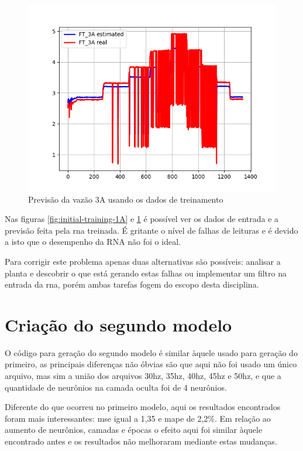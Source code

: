 \documentclass[12pt]{article}
\begin{document}
\begin{figure}
    \centering
    \includegraphics{results/initial-training-3A.png}
    \caption{Previsão da vazão 3A usando os dados de treinamento}
    \label{fig:initial-training-3A}
\end{figure}

Nas figuras \ref{fig:initial-training-1A} e \ref{fig:initial-training-3A} é possível ver os dados de entrada e a previsão feita pela \acrshort{rna} treinada. É gritante o nível de falhas de leituras e é devido a isto que o desempenho da RNA não foi o ideal.

Para corrigir este problema apenas duas alternativas são possíveis: analisar a planta e descobrir o que está gerando estas falhas ou implementar um filtro na entrada da \acrshort{rna}, porém ambas tarefas fogem do escopo desta disciplina.

\section{Criação do segundo modelo}
\label{sec:modelo2}



O código para geração do segundo modelo é similar àquele usado para geração do primeiro, as principais diferenças não óbvias são que aqui não foi usado um único arquivo, mas sim a união dos arquivos 30hz, 35hz, 40hz, 45hz e 50hz, e que a quantidade de neurônios na camada oculta foi de 4 neurônios.

Diferente do que ocorreu no primeiro modelo, aqui os resultados encontrados foram mais interessantes: \acrshort{mse} igual a 1,35 e \acrshort{mape} de 2,2\%. Em relação ao aumento de neurônios, camadas e épocas o efeito aqui foi similar àquele encontrado antes e os resultados não melhoraram mediante estas mudanças.
\end{document}
